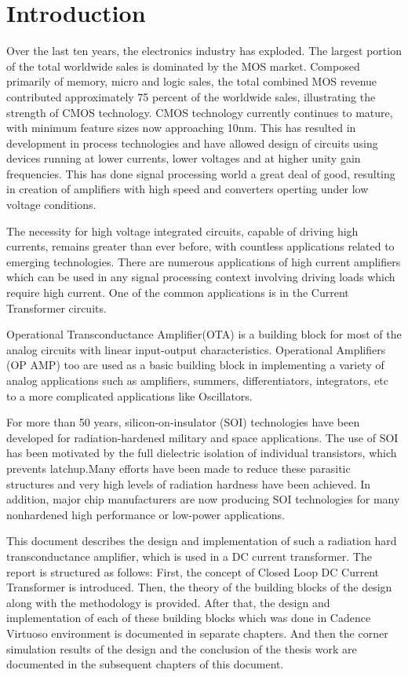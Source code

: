 \chapter{Introduction}
Over the last ten years, the electronics industry has exploded. The largest portion of the total worldwide sales is dominated by the MOS market. Composed primarily of memory, micro and logic sales, the total combined MOS revenue contributed approximately 75 percent of the worldwide sales, illustrating the strength of CMOS technology. CMOS technology currently continues to mature, with minimum feature sizes now approaching 10nm. This has resulted in development in process technologies and have allowed design of circuits using devices running at lower currents, lower voltages and at higher unity gain frequencies. This has done signal processing world a great deal of good, resulting in creation of amplifiers with high speed and converters operting under low voltage conditions.

The necessity for high voltage integrated circuits, capable of driving high currents, remains greater than ever before, with countless applications related to emerging technologies. There are numerous applications of high current amplifiers which can be used in any signal processing context involving driving loads which require high current. One of the common applications is in the Current Transformer circuits.

Operational Transconductance Amplifier(OTA) is a building block for most of the analog circuits with linear input-output characteristics. Operational Amplifiers (OP AMP) too are used as a basic building block in implementing a variety of analog applications such as amplifiers, summers, differentiators, integrators, etc to a more complicated applications like Oscillators. 

For more than 50 years, silicon-on-insulator (SOI) technologies have been developed for radiation-hardened military and space applications.  The  use  of  SOI  has  been  motivated  by  the  full dielectric  isolation  of  individual  transistors,  which  prevents
latchup.Many efforts have been made to reduce these parasitic structures and very high levels of radiation hardness have been achieved. In addition, major chip manufacturers are now producing SOI technologies for many nonhardened high performance or low-power applications.

This document describes the design and implementation of such a radiation hard transconductance amplifier, which is used in a DC current transformer. The report is structured as follows: First, the concept of Closed Loop DC Current Transformer is introduced. Then, the theory of the building blocks of the design along with the methodology is provided. After that, the design and implementation of each of these building blocks which was done in Cadence Virtuoso environment is documented in separate chapters. And then the corner simulation results of the design and the conclusion of the thesis work are documented in the subsequent chapters of this document.

